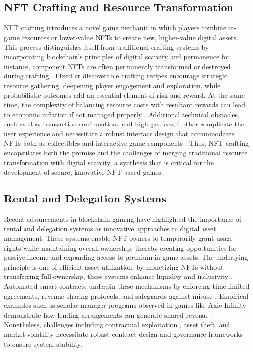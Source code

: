 \subsection{NFT Crafting and Resource Transformation}

NFT crafting introduces a novel game mechanic in which players combine in-game
resources or lower-value NFTs to create new, higher-value digital assets. This
process distinguishes itself from traditional crafting systems by incorporating
blockchain’s principles of digital scarcity and permanence for instance,
component NFTs are often permanently transformed or destroyed during crafting
\cite{shiApplicationsNFTsAI2024}. Fixed or discoverable crafting recipes
encourage strategic resource gathering, deepening player engagement and
exploration, while probabilistic outcomes add an essential element of risk and
reward. At the same time, the complexity of balancing resource costs with
resultant rewards can lead to economic inflation if not managed properly
\cite{wangNonFungibleTokenNFT2021}. Additional technical obstacles, such as
slow transaction confirmations and high gas fees, further complicate the user
experience and necessitate a robust interface design that accommodates NFTs both
as collectibles and interactive game components
\cite{murrayMechanicsBlockchainTaxonomy2022, popescuNonFungibleTokensNFT2021}.
Thus, NFT crafting encapsulates both the promise and the challenges of merging
traditional resource transformation with digital scarcity, a synthesis that is
critical for the development of secure, innovative NFT-based games.

\subsection{Rental and Delegation Systems}

Recent advancements in blockchain gaming have highlighted the importance of
rental and delegation systems as innovative approaches to digital asset
management. These systems enable NFT owners to temporarily grant usage rights
while maintaining overall ownership, thereby creating opportunities for passive
income and expanding access to premium in-game assets. The underlying principle
is one of efficient asset utilization; by monetizing NFTs without transferring
full ownership, these systems enhance liquidity and inclusivity
\cite{popescuNonFungibleTokensNFT2021,
	shazhaevPlaytoHashEconomicsMetaverses2022}. Automated smart contracts underpin
these mechanisms by enforcing time-limited agreements, revenue-sharing
protocols, and safeguards against misuse
\cite{stamatakisBlockchainPoweredGamingBridging2024}. Empirical examples such as
scholar-manager programs observed in games like Axie Infinity demonstrate how
lending arrangements can generate shared revenue
\cite{tanAssetizingVideoGame2025}. Nonetheless, challenges including contractual
exploitation \cite{delfabbroUnderstandingMechanicsConsumer2022}, asset theft,
and market volatility necessitate robust contract design and governance
frameworks to ensure system stability.

